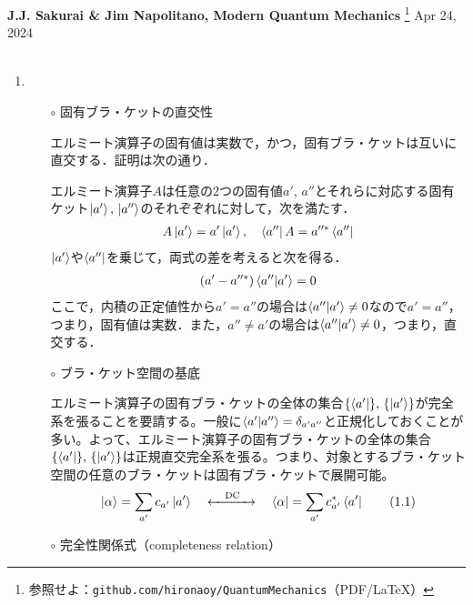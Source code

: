 \documentclass{jarticle}
\begin{document}
\noindent
\textbf{J.J. Sakurai \& Jim Napolitano, Modern Quantum Mechanics}
\footnote{
  参照せよ：\texttt{github.com/hironaoy/QuantumMechanics}（PDF/\LaTeX）
}
\hfill Apr 24, 2024\vspace{-2mm} \\
\hrulefill \\

\noindent
\begin{enumerate}
\item {}

  \begin{itemize}
  \item [$\circ$] 固有ブラ・ケットの直交性

    エルミート演算子の固有値は実数で，かつ，固有ブラ・ケットは互いに直交する．証明は次の通り．

    エルミート演算子$A$は任意の2つの固有値$a', \, a''$とそれらに対応する固有ケット$\ket{a'}, \, \ket{a''}$のそれぞぞれに対して，次を満たす．
    \begin{align}
      A\ket{a'} = a'\ket{a'}, \quad \bra{a''}A = a''^*\bra{a''}
    \end{align}
    $\ket{a'}$や$\bra{a''}$を乗じて，両式の差を考えると次を得る．
    \begin{align}
      (a' - a''^*) \bra{a''}\ket{a'} = 0
    \end{align}
    ここで，内積の正定値性から$a' = a''$の場合は$\bra{a''}\ket{a'} \ne 0$なので$a' = a''$，つまり，固有値は実数．また，$a'' \ne a'$の場合は$\bra{a''}\ket{a'} \ne 0$，つまり，直交する．

  \item [$\circ$] ブラ・ケット空間の基底

    エルミート演算子の固有ブラ・ケットの全体の集合$\qty{\bra{a'}}, \, \qty{\ket{a'}}$が完全系を張ることを要請する。一般に$\bra{a'}\ket{a''} = \delta_{a'a''}$と正規化しておくことが多い。よって、エルミート演算子の固有ブラ・ケットの全体の集合$\qty{\bra{a'}}, \, \qty{\ket{a'}}$は正規直交完全系を張る。つまり、対象とするブラ・ケット空間の任意のブラ・ケットは固有ブラ・ケットで展開可能。
    \begin{align}
      \ket{\alpha} = \sum_{a'} c_{a'} \ket{a'} \quad \xleftrightarrow{\quad\mathrm{DC}\quad} \quad 
      \bra{\alpha} = \sum_{a'} c_{a'}^* \bra{a'} \tag{1.1} \label{expansion}
    \end{align}

  \item [$\circ$] 完全性関係式（completeness relation）


\end{itemize}
\end{enumerate}
\end{document}

